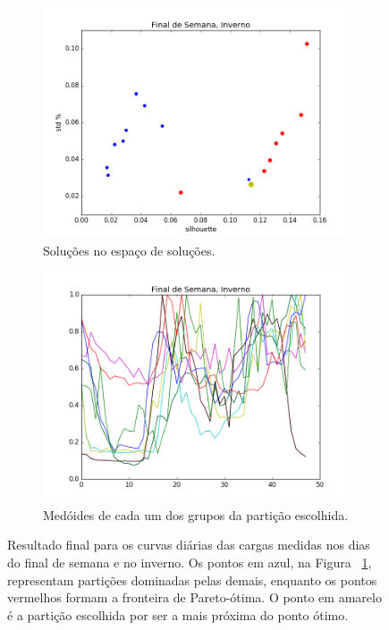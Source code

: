 \begin{figure}[!h]
	\centering
	\begin{subfigure}{.5\textwidth}
		\centering
		\includegraphics[width=.9\linewidth]{figuras/australia_5000/pareto_Final_de_Semana_Inverno.png}
		\caption{Soluções no espaço de soluções.}
		\label{fig:pareto_FDS_inverno}
	\end{subfigure}%
	\begin{subfigure}{.5\textwidth}
		\centering
		\includegraphics[width=.9\linewidth]{figuras/australia_5000/Final_de_Semana_Inverno.png}
		\caption{Medóides de cada um dos grupos da partição escolhida.}
		\label{fig:FDS_inverno}
	\end{subfigure}
	\caption{Resultado final para os curvas diárias das cargas medidas nos dias do final de semana e no inverno. Os pontos em azul, na Figura ~\ref{fig:pareto_FDS_inverno}, representam partições dominadas pelas demais, enquanto os pontos vermelhos formam a fronteira de Pareto-ótima. O ponto em amarelo é a partição escolhida por ser a mais próxima do ponto ótimo.}
	\label{fig:FDS_inverno_}
\end{figure}

